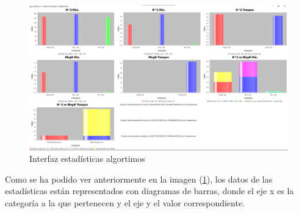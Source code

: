 \begin{figure}[!h]
    \centering
    \includegraphics[width=\linewidth]{MVC/View/img/stats-algt.png}
    \caption{Interfaz estadísticas algortimos}
    \label{fig:Ejemplo stats Algt}
\end{figure}

Como se ha podido ver anteriormente en la imagen (\ref{fig:Ejemplo stats Algt}), los datos de las estadísticas están representados con diagramas de barras, donde el eje x es la categoría a la que pertenecen y el eje y el valor correspondiente.
